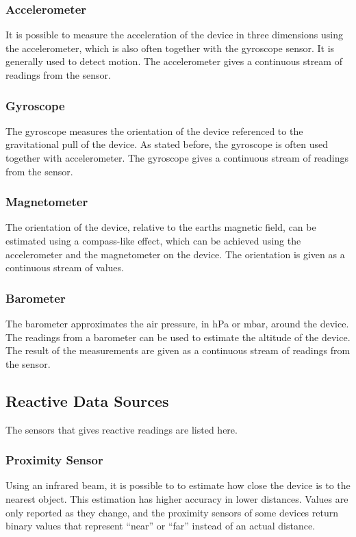 \subsubsection{Accelerometer}
\label{sub:accelerometer}
It is possible to measure the acceleration of the device in three dimensions using the accelerometer, which is also often together with the gyroscope sensor. It is generally used to detect motion. The accelerometer gives a continuous stream of readings from the sensor.

\subsubsection{Gyroscope}
\label{sub:gyroscope}
The gyroscope measures the orientation of the device referenced to the gravitational pull of the device. As stated before, the gyroscope is often used together with accelerometer. The gyroscope gives a continuous stream of readings from the sensor.

\subsubsection{Magnetometer}
\label{sub:compass}
The orientation of the device, relative to the earths magnetic field, can be estimated using a compass-like effect, which can be achieved using the accelerometer and the magnetometer on the device. The orientation is given as a continuous stream of values.

\subsubsection{Barometer}
\label{sub:barometer}
The barometer approximates the air pressure, in hPa or mbar, around the device. The readings from a barometer can be used to estimate the altitude of the device. The result of the measurements are given as a continuous stream of readings from the sensor. 

\subsection{Reactive Data Sources}
\label{sub:on_change_reporting_sensors}
The sensors that gives reactive readings are listed here.

\subsubsection{Proximity Sensor}
\label{sub:proximity_sensor}
Using an infrared beam, it is possible to to estimate how close the device is to the nearest object. This estimation has higher accuracy in lower distances. Values are only reported as they change, and the proximity sensors of some devices return binary values that represent ``near'' or ``far'' instead of an actual distance.

